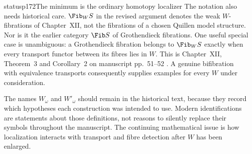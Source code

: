 \begin{dcomment}{status}{p172}{The minimum is the ordinary homotopy localizer}
The notation also needs historical care. $\Fib_W S$ in the revised argument denotes the weak $W$-fibrations of Chapter~XII, not the fibrations of a chosen Quillen model structure. Nor is it the earlier category $\Fib S$ of Grothendieck fibrations. One useful special case is unambiguous: a Grothendieck fibration belongs to $\Fib_W S$ exactly when every transport functor between its fibres lies in $W$. This is Chapter~XII, Theorem~3 and Corollary~2 on manuscript pp.~51--52 \citep{GrothendieckDerivateursXII}. A genuine bifibration with equivalence transports consequently supplies examples for every $W$ under consideration.

The names $W_\omega$ and $W'_\omega$ should remain in the historical text, because they record which hypotheses each construction was intended to use. Modern identifications are statements about those definitions, not reasons to silently replace their symbols throughout the manuscript. The continuing mathematical issue is how localization interacts with transport and fibre detection after $W$ has been enlarged.
\end{dcomment}

